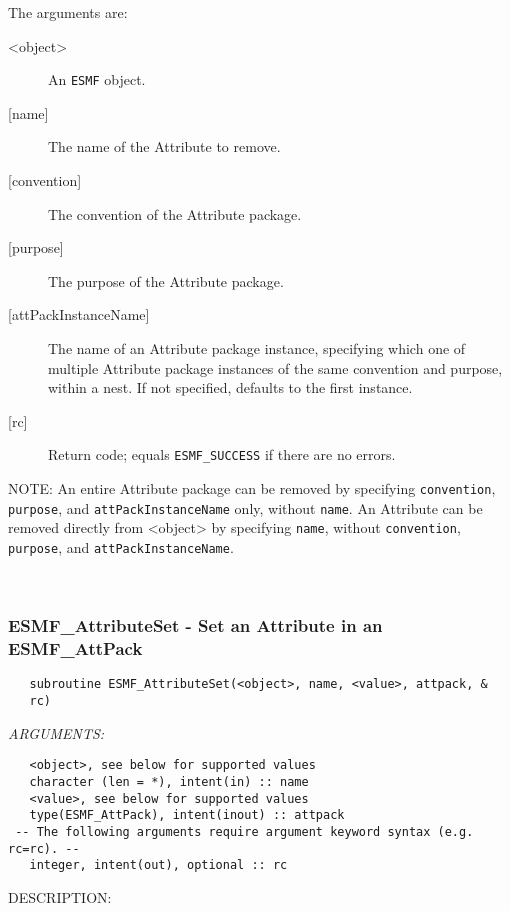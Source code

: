    The arguments are:
   \begin{description}
   \item [<object>]
   An {\tt ESMF} object.
   \item [{[name]}]
   The name of the Attribute to remove.
   \item [{[convention]}]
   The convention of the Attribute package.
   \item [{[purpose]}]
   The purpose of the Attribute package.
   \item [{[attPackInstanceName]}]
   The name of an Attribute package instance, specifying which one
   of multiple Attribute package instances of the same convention
   and purpose, within a nest. If not specified, defaults to the
   first instance.
   \item [{[rc]}]
   Return code; equals {\tt ESMF\_SUCCESS} if there are no errors.
   \end{description}
  
   NOTE: An entire Attribute package can be removed by specifying
   {\tt convention}, {\tt purpose}, and {\tt attPackInstanceName}
   only, without {\tt name}. An
   Attribute can be removed directly from <object> by specifying
   {\tt name}, without {\tt convention}, {\tt purpose}, and
   {\tt attPackInstanceName}.
  
   
 
\mbox{}\hrulefill\ 
 
\subsubsection [ESMF\_AttributeSet] {ESMF\_AttributeSet - Set an Attribute in an ESMF\_AttPack}


  
\begin{verbatim}   subroutine ESMF_AttributeSet(<object>, name, <value>, attpack, &
   rc)\end{verbatim}{\em ARGUMENTS:}
\begin{verbatim}   <object>, see below for supported values
   character (len = *), intent(in) :: name
   <value>, see below for supported values
   type(ESMF_AttPack), intent(inout) :: attpack
 -- The following arguments require argument keyword syntax (e.g. rc=rc). --
   integer, intent(out), optional :: rc\end{verbatim}
{\sf DESCRIPTION:\\ }


